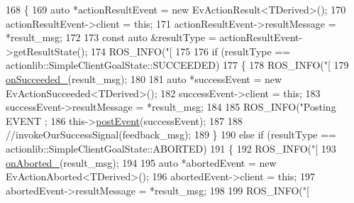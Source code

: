 \begin{DoxyCode}
168     \{
169         \textcolor{keyword}{auto} *actionResultEvent = \textcolor{keyword}{new} EvActionResult<TDerived>();
170         actionResultEvent->client = \textcolor{keyword}{this};
171         actionResultEvent->resultMessage = *result\_msg;
172 
173         \textcolor{keyword}{const} \textcolor{keyword}{auto} &resultType = actionResultEvent->getResultState();
174         ROS\_INFO(\textcolor{stringliteral}{"[%
175 
176         \textcolor{keywordflow}{if} (resultType == actionlib::SimpleClientGoalState::SUCCEEDED)
177         \{
178             ROS\_INFO(\textcolor{stringliteral}{"[%
179             \hyperlink{classsmacc_1_1SmaccActionClientBase_a033d789a6688b5064be4843a82fa007f}{onSucceeded\_}(result\_msg);
180 
181             \textcolor{keyword}{auto} *successEvent = \textcolor{keyword}{new} EvActionSucceeded<TDerived>();
182             successEvent->client = \textcolor{keyword}{this};
183             successEvent->resultMessage = *result\_msg;
184 
185             ROS\_INFO(\textcolor{stringliteral}{"Posting EVENT %
      ;
186             this->\hyperlink{classsmacc_1_1ISmaccClient_a46cbc0d695214efe40d29247323bfc80}{postEvent}(successEvent);
187 
188             \textcolor{comment}{//invokeOurSuccessSignal(feedback\_msg);}
189         \}
190         \textcolor{keywordflow}{else} \textcolor{keywordflow}{if} (resultType == actionlib::SimpleClientGoalState::ABORTED)
191         \{
192             ROS\_INFO(\textcolor{stringliteral}{"[%
193             \hyperlink{classsmacc_1_1SmaccActionClientBase_acb66868d20faa3c5d7065991b4a306ec}{onAborted\_}(result\_msg);
194 
195             \textcolor{keyword}{auto} *abortedEvent = \textcolor{keyword}{new} EvActionAborted<TDerived>();
196             abortedEvent->client = \textcolor{keyword}{this};
197             abortedEvent->resultMessage = *result\_msg;
198 
199             ROS\_INFO(\textcolor{stringliteral}{"[%
}}}}}
\end{DoxyCode}
